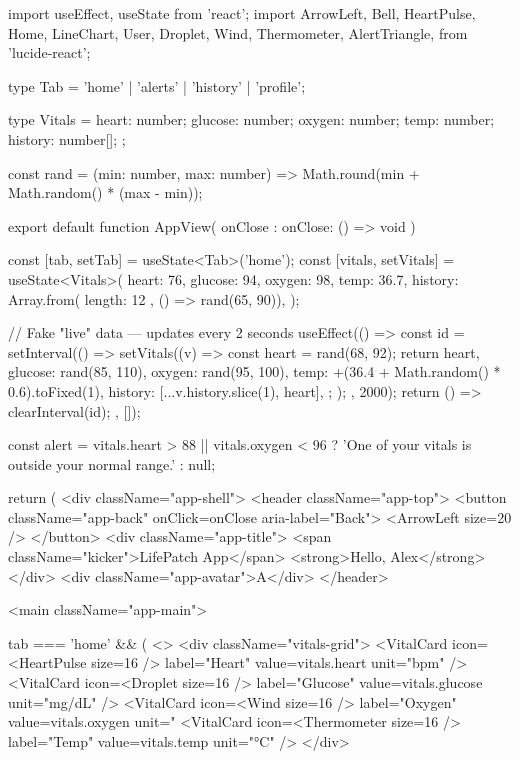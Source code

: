 import { useEffect, useState } from 'react';
import {
  ArrowLeft, Bell, HeartPulse, Home, LineChart, User,
  Droplet, Wind, Thermometer, AlertTriangle,
} from 'lucide-react';

type Tab = 'home' | 'alerts' | 'history' | 'profile';

type Vitals = {
  heart: number;
  glucose: number;
  oxygen: number;
  temp: number;
  history: number[];
};

const rand = (min: number, max: number) =>
  Math.round(min + Math.random() * (max - min));

export default function AppView({ onClose }: { onClose: () => void }) {
  const [tab, setTab] = useState<Tab>('home');
  const [vitals, setVitals] = useState<Vitals>({
    heart: 76,
    glucose: 94,
    oxygen: 98,
    temp: 36.7,
    history: Array.from({ length: 12 }, () => rand(65, 90)),
  });

  // Fake "live" data — updates every 2 seconds
  useEffect(() => {
    const id = setInterval(() => {
      setVitals((v) => {
        const heart = rand(68, 92);
        return {
          heart,
          glucose: rand(85, 110),
          oxygen: rand(95, 100),
          temp: +(36.4 + Math.random() * 0.6).toFixed(1),
          history: [...v.history.slice(1), heart],
        };
      });
    }, 2000);
    return () => clearInterval(id);
  }, []);

  const alert =
    vitals.heart > 88 || vitals.oxygen < 96
      ? 'One of your vitals is outside your normal range.'
      : null;

  return (
    <div className="app-shell">
      <header className="app-top">
        <button className="app-back" onClick={onClose} aria-label="Back">
          <ArrowLeft size={20} />
        </button>
        <div className="app-title">
          <span className="kicker">LifePatch App</span>
          <strong>Hello, Alex</strong>
        </div>
        <div className="app-avatar">A</div>
      </header>

      <main className="app-main">
        {tab === 'home' && (
          <>
            <div className="vitals-grid">
              <VitalCard icon={<HeartPulse size={16} />} label="Heart" value={vitals.heart} unit="bpm" />
              <VitalCard icon={<Droplet size={16} />} label="Glucose" value={vitals.glucose} unit="mg/dL" />
              <VitalCard icon={<Wind size={16} />} label="Oxygen" value={vitals.oxygen} unit="%
              <VitalCard icon={<Thermometer size={16} />} label="Temp" value={vitals.temp} unit="°C" />
            </div>

}}

